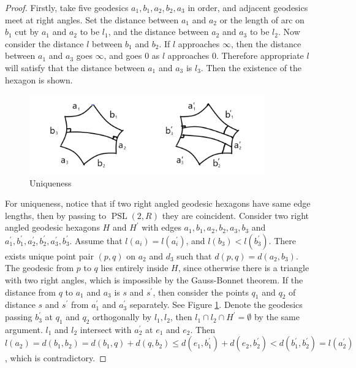  \begin{proof}
Firstly, take five geodesics $a_1,b_1,a_2,b_2,a_3$ in order, and adjacent geodesics meet at right angles.
Set the distance between $a_1$ and $a_2$ or the length of arc on $b_1$ cut by $a_1$ and $a_2$ to be $l_1$, and the distance between $a_2$ and $a_3$ to be $l_2$. Now consider the distance $l$ between $b_1$ and  $b_2$.
If $l$ approaches $\infty$, then the distance between $a_1$ and $a_3$ goes $\infty$, and goes $0$ as $l$ approaches $0$.
Therefore appropriate $l$ will satisfy that the distance between $a_1$ and $a_3$ is $l_3$.
Then  the existence of the hexagon is shown. 


\begin{figure}[h]
    \centering
    \includegraphics[width=4in]{picture/uniqueness.png}
    \caption{Uniqueness}
    \label{fig:uniqueness}
\end{figure}

For uniqueness, notice that if two right angled geodesic hexagons have same edge lengths, then by passing to $\operatorname{PSL}(2,R)$ they are coincident. Consider two right angled geodesic hexagons $H$ and $H^\prime$ with edges $a_1,b_1,a_2,b_2,a_3,b_3$ and $a_1^\prime,b_1^\prime,a_2^\prime,b_2^\prime,a_3^\prime,b_3^\prime$. Assume that $l(a_i)=l(a_i^\prime)$, and $l(b_3)<l(b_3^\prime)$. There  exists unique point pair $(p,q)$ on $a_2$ and $d_3$ such that $d(p,q)=d(a_2,b_3)$. The geodesic from  $p$ to $q$ lies entirely inside $H$, since otherwise there is a triangle with two right angles, which is impossible by the Gauss-Bonnet theorem.  If the distance from $q$ to $a_1$ and $a_3$ is $s$ and $s^\prime$, then consider the points $q_1$ and $q_2$ of distance $s$ and $s^\prime$ from $a_1^\prime$ and $a_3^\prime$ separately. See Figure \ref{fig:uniqueness}. Denote the geodesics passing $b_3^\prime$ at $q_1$ and $q_2$ orthogonally  by $l_1,l_2$, then $l_1\cap l_2\cap H^\prime=\emptyset$ by the same argument. $l_1$ and $l_2$ intersect with $a_2^\prime$ at $e_1$ and $e_2$. Then $l(a_2)=d(b_1,b_2)= d(b_1,q)+d(q,b_2)\leq d(e_1,b_1^\prime)+d(e_2,b_2^\prime)<d(b_1^\prime,b_2^\prime)=l(a_2^\prime)$, which is contradictory. 
\end{proof} 
 
